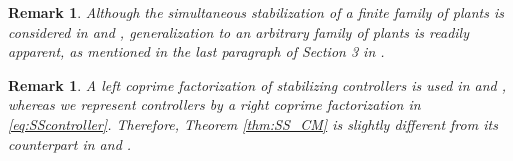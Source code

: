 \documentclass[letterpaper, 12pt, draftcls, onecolumn]{ieeeconf}
\newtheorem{remark}[theorem]{Remark}
\begin{document}
\begin{remark}
		Although the simultaneous stabilization of a {\em finite} family of plants is considered in
		\cite[Sec. 5.4]{vidyasagar1985} and 
		\cite{Vidyasagar1982},
		generalization to an {\em arbitrary} family of plants is readily apparent,
		as mentioned in the last paragraph of Section 3 in \cite{Vidyasagar1982}.
\end{remark}
\begin{remark}
		A {\em left} coprime factorization of stabilizing controllers
		is used in 
		\cite[Sec. 5.4]{vidyasagar1985} and 
		\cite{Vidyasagar1982},
		whereas we represent controllers by a {\em right} coprime 
		factorization in \eqref{eq:SScontroller}.
		Therefore, Theorem \ref{thm:SS_CM} is slightly different
		from its counterpart in 
		\cite[Sec. 5.4]{vidyasagar1985} and
		\cite{Vidyasagar1982}.
\end{remark}
\end{document}
